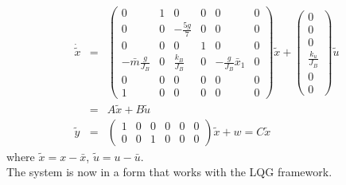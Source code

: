 \begin{eqnarray*}
\dot{\tilde{x}} & = & \begin{pmatrix}0 & 1 & 0 & 0 & 0 & 0\\
0 & 0 & -\frac{5g}{7} & 0 & 0 & 0\\
0 & 0 & 0 & 1 & 0 & 0\\
-\bar{m}\frac{g}{J_B} & 0 & \frac{k_B}{J_B} & 0 & -\frac{g}{J_B}\bar{x}_{1} & 0\\
0 & 0 & 0 & 0 & 0 & 0\\
1 & 0 & 0 & 0 & 0 & 0
\end{pmatrix}\tilde{x}+\begin{pmatrix}0\\
0\\
0\\
\frac{k_{u}}{J_B}\\
0\\
0
\end{pmatrix}\tilde{u}\\
 & = & A\tilde{x}+B\tilde{u}\\
\tilde{y} & = & \begin{pmatrix}1 & 0 & 0 & 0 & 0 & 0\\
0 & 0 & 1 & 0 & 0 & 0
\end{pmatrix}\tilde{x}+w=C\tilde{x}
\end{eqnarray*}
where $\tilde{x}=x-\bar{x}$, $\tilde{u}=u-\bar{u}$.
\\
The system is now in a form that works with the LQG framework.






